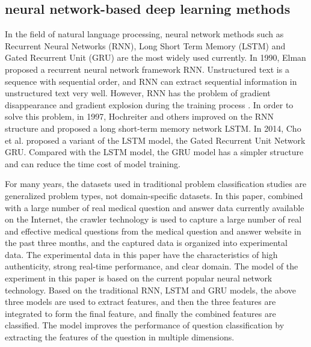 \documentclass{article}
\begin{document}
\subsection{neural network-based deep learning methods}
In the field of natural language processing, neural network methods such as Recurrent Neural Networks (RNN), Long Short Term Memory (LSTM) and Gated Recurrent Unit (GRU) are the most widely used currently. In 1990, Elman \cite{elman1990finding} proposed a recurrent neural network framework RNN. Unstructured text is a sequence with sequential order, and RNN can extract sequential information in unstructured text very well. However, RNN has the problem of gradient disappearance and gradient explosion during the training process \cite{hochreiter2001gradient}. In order to solve this problem, in 1997, Hochreiter \cite{hochreiter1997long} and others improved on the RNN structure and proposed a long short-term memory network LSTM. In 2014, Cho \cite{cho2014learning} et al. proposed a variant of the LSTM model, the Gated Recurrent Unit Network GRU. Compared with the LSTM model, the GRU model has a simpler structure and can reduce the time cost of model training.

For many years, the datasets used in traditional problem classification studies are generalized problem types, not domain-specific datasets. In this paper, combined with a large number of real medical question and answer data currently available on the Internet, the crawler technology is used to capture a large number of real and effective medical questions from the medical question and answer website in the past three months, and the captured data is organized into experimental data. The experimental data in this paper have the characteristics of high authenticity, strong real-time performance, and clear domain. The model of the experiment in this paper is based on the current popular neural network technology. Based on the traditional RNN, LSTM and GRU models, the above three models are used to extract features, and then the three features are integrated to form the final feature, and finally the combined features are classified. The model improves the performance of question classification by extracting the features of the question in multiple dimensions.
\end{document}

